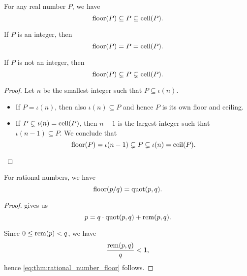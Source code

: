 \begin{proposition}\label{thm:real_floor_ceiling_interval}
  For any real number \( P \), we have
  \begin{equation*}
    \operatorname{floor}(P) \subseteq P \subseteq \operatorname{ceil}(P).
  \end{equation*}

  \begin{thmenum}
     If \( P \) is an integer, then
    \begin{equation*}
      \operatorname{floor}(P) = P = \operatorname{ceil}(P).
    \end{equation*}

     If \( P \) is not an integer, then
    \begin{equation*}
      \operatorname{floor}(P) \subsetneq P \subsetneq \operatorname{ceil}(P).
    \end{equation*}
  \end{thmenum}
\end{proposition}
\begin{proof}
  Let \( n \) be the smallest integer such that \( P \subseteq \iota(n) \).
  \begin{itemize}
    \item If \( P = \iota(n) \), then also \( \iota(n) \subseteq P \) and hence \( P \) is its own floor and ceiling.
    \item If \( P \subsetneq \iota(n) = \operatorname{ceil}(P) \), then \( n - 1 \) is the largest integer such that \( \iota(n - 1) \subseteq P \). We conclude that
    \begin{equation*}
      \operatorname{floor}(P) = \iota(n - 1) \subsetneq P \subsetneq \iota(n) = \operatorname{ceil}(P).
    \end{equation*}
  \end{itemize}
\end{proof}

\begin{proposition}\label{thm:rational_number_floor}
  For rational numbers, we have
  \begin{equation}\label{eq:thm:rational_number_floor}
    \operatorname{floor}(p / q) = \operatorname{quot}(p, q).
  \end{equation}
\end{proposition}
\begin{proof}
   gives us
  \begin{equation*}
    p = q \cdot \operatorname{quot}(p, q) + \operatorname{rem}(p, q).
  \end{equation*}

  Since \( 0 \leq \operatorname{rem}(p) < q \), we have
  \begin{equation*}
    \frac {\operatorname{rem}(p, q)} q < 1,
  \end{equation*}
  hence \eqref{eq:thm:rational_number_floor} follows.
\end{proof}

